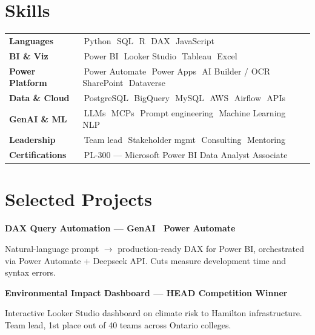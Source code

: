 \documentclass[10pt,letterpaper]{article}
\newcommand{\chip}[1]{%
  \colorbox{chip}{\textcolor{ink}{\footnotesize\,#1\,}}\hspace{1pt}
}
\begin{document}
\section*{Skills}

\begin{tabularx}{\linewidth}{@{}l X@{}}
  \textbf{Languages}         & \chip{Python} \chip{SQL} \chip{R} \chip{DAX} \chip{JavaScript} \\[2pt]
  \textbf{BI \& Viz}         & \chip{Power BI} \chip{Looker Studio} \chip{Tableau} \chip{Excel} \\[2pt]
  \textbf{Power Platform}    & \chip{Power Automate} \chip{Power Apps} \chip{AI Builder / OCR} \chip{SharePoint} \chip{Dataverse} \\[2pt]
  \textbf{Data \& Cloud}     & \chip{PostgreSQL} \chip{BigQuery} \chip{MySQL} \chip{AWS} \chip{Airflow} \chip{APIs} \\[2pt]
  \textbf{GenAI \& ML}       & \chip{LLMs} \chip{MCPs} \chip{Prompt engineering} \chip{Machine Learning} \chip{NLP} \\[2pt]
  \textbf{Leadership}        & \chip{Team lead} \chip{Stakeholder mgmt} \chip{Consulting} \chip{Mentoring} \\
  \textbf{Certifications}    & \chip{PL-300 --- Microsoft Power BI Data Analyst Associate} \\
\end{tabularx}

\section*{Selected Projects}

\noindent\textbf{DAX Query Automation --- GenAI \textperiodcentered\ Power Automate}\par
Natural-language prompt $\rightarrow$ production-ready DAX for Power BI, orchestrated via Power Automate + Deepseek API. Cuts measure development time and syntax errors.
\vspace{4pt}

\noindent\textbf{Environmental Impact Dashboard --- HEAD Competition Winner}\par
Interactive Looker Studio dashboard on climate risk to Hamilton infrastructure. Team lead, 1st place out of 40 teams across Ontario colleges.
\vspace{4pt}
\end{document}
